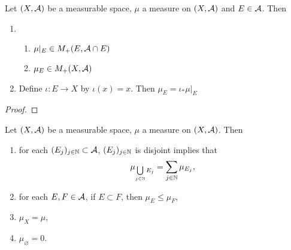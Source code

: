 \documentclass{book}
\begin{document}

	\begin{ex}  
		Let $(X, \mathcal{A})$ be a measurable space, $\mu$ a measure on $(X, \mathcal{A})$ and $E \in \mathcal{A}$. Then 
		\begin{enumerate}
			\item \begin{enumerate}
				\item $\mu|_E \in M_+(E, \mathcal{A} \cap E)$
				\item $\mu_E \in M_+(X, \mathcal{A})$
			\end{enumerate}
			\item Define $\iota: E \rightarrow X$ by $\iota(x) = x$. Then $\mu_E = \iota_*\mu|_E$
		\end{enumerate} 
	\end{ex}

	\begin{proof}
	\end{proof}

	\begin{ex} 
		Let $(X, \mathcal{A})$ be a measurable space, $\mu$ a measure on $(X, \mathcal{A})$. Then 
		\begin{enumerate}
			\item for each $(E_j)_{j \in \mathbb{N}} \subset \mathcal{A}$, $(E_j)_{j \in \mathbb{N}}$ is disjoint implies that  
			$$\mu_{\bigcup\limits_{j \in \mathbb{N}} E_j} = \sum_{j \in \mathbb{N}} \mu_{E_j},$$
			\item for each $E,F \in \mathcal{A}$, if $E \subset F$, then $\mu_E \leq \mu_F$,
			\item $\mu_X = \mu$,
			\item $\mu_{\varnothing} = 0$.
		\end{enumerate}
	\end{ex}
\end{document}
